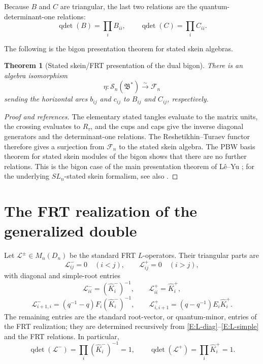 \documentclass[11pt]{amsart}
\newtheorem{theorem}{Theorem}[section]
\theoremstyle{definition}
\theoremstyle{remark}
\begin{document}
Because \(B\) and \(C\) are triangular, the last two relations are the
quantum-determinant-one relations:
\[
\operatorname{qdet}(B)=\prod_i B_{ii},\qquad
\operatorname{qdet}(C)=\prod_i C_{ii}.
\]

The following is the bigon presentation theorem for stated skein algebras.

\begin{theorem}[Stated skein/FRT presentation of the dual bigon]
\label{T:bigon-FRT}
There is an algebra isomorphism
\[
\eta:\mathcal S_n(\mathfrak B^*)\xrightarrow{\sim}\mathcal F_n
\]
sending the horizontal arcs \(b_{ij}\) and \(c_{ij}\) to \(B_{ij}\) and
\(C_{ij}\), respectively.
\end{theorem}

\begin{proof}[Proof and references]
The elementary stated tangles evaluate to the matrix units, the crossing
evaluates to \(R_\tau\), and the cups and caps give the inverse diagonal
generators and the determinant-one relations.  The Reshetikhin--Turaev
functor therefore gives a surjection from \(\mathcal F_n\) to the stated
skein algebra.  The PBW basis theorem for stated skein modules of the bigon
shows that there are no further relations.  This is the bigon case of the
main presentation theorem of L\^e--Yu \cite{LY}; for the underlying
\(SL_n\)-stated skein formalism, see also \cite{Le}.
\end{proof}

\section{The FRT realization of the generalized double}

Let \(\mathcal L^\pm\in M_n(D_n)\) be the standard FRT \(L\)-operators.
Their triangular parts are
\begin{equation}\label{E:Lpm}
\mathcal L^-_{ij}=0\quad(i<j),\qquad
\mathcal L^+_{ij}=0\quad(i>j),
\end{equation}
with diagonal and simple-root entries
\begin{equation}\label{E:L-diag}
\mathcal L^-_{ii}=(\hat K_i^-)^{-1},\qquad
\mathcal L^+_{ii}=\hat K_i^+,
\end{equation}
\begin{equation}\label{E:L-simple}
\mathcal L^-_{i+1,i}
=(q^{-1}-q)F_i(\hat K_i^-)^{-1},
\qquad
\mathcal L^+_{i,i+1}
=(q-q^{-1})E_i\hat K_i^+.
\end{equation}
The remaining entries are the standard root-vector, or quantum-minor,
entries of the FRT realization; they are determined recursively from
\eqref{E:L-diag}--\eqref{E:L-simple} and the FRT relations.  In particular,
\[
\operatorname{qdet}(\mathcal L^-)
=\prod_i(\hat K_i^-)^{-1}=1,
\qquad
\operatorname{qdet}(\mathcal L^+)
=\prod_i\hat K_i^+=1.
\]
\end{document}

